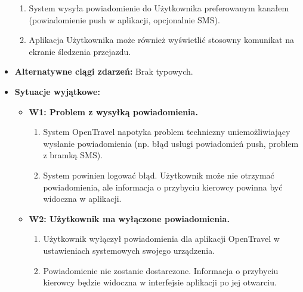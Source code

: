 \documentclass[a4paper,12pt]{article}
\begin{document}
\begin{itemize}
\begin{enumerate}
            \item System wysyła powiadomienie do Użytkownika preferowanym kanałem (powiadomienie push w aplikacji, opcjonalnie SMS).
            \item Aplikacja Użytkownika może również wyświetlić stosowny komunikat na ekranie śledzenia przejazdu.
        \end{enumerate}
    \item \textbf{Alternatywne ciągi zdarzeń:} Brak typowych.
    \item \textbf{Sytuacje wyjątkowe:}
        \begin{itemize}
            \item \textbf{W1: Problem z wysyłką powiadomienia.}
                \begin{enumerate}
                    \item System OpenTravel napotyka problem techniczny uniemożliwiający wysłanie powiadomienia (np. błąd usługi powiadomień push, problem z bramką SMS).
                    \item System powinien logować błąd. Użytkownik może nie otrzymać powiadomienia, ale informacja o przybyciu kierowcy powinna być widoczna w aplikacji.
                \end{enumerate}
            \item \textbf{W2: Użytkownik ma wyłączone powiadomienia.}
                \begin{enumerate}
                    \item Użytkownik wyłączył powiadomienia dla aplikacji OpenTravel w ustawieniach systemowych swojego urządzenia.
                    \item Powiadomienie nie zostanie dostarczone. Informacja o przybyciu kierowcy będzie widoczna w interfejsie aplikacji po jej otwarciu.
                \end{enumerate}
        \end{itemize}
\end{itemize}
\end{document}
